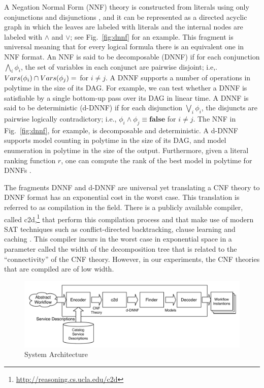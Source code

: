 \documentclass{llncs}
\begin{document}
A Negation Normal Form (NNF) theory is constructed from literals using only conjunctions
and disjunctions \cite{barwise:handbook}, and it can be represented as a directed
acyclic graph in which the leaves are labeled with literals and the internal nodes
are labeled with $\land$ and $\lor$; see Fig.~\ref{fig:dnnf} for an example.
This fragment is universal meaning that for every logical formula there is an
equivalent one in NNF format.
An NNF is said to be decomposable (DNNF) \cite{darwiche:d-dnnfs} if for each conjunction
$\bigwedge_i\phi_i$, the set of variables in each conjunct are pairwise disjoint; i.e,.
$Vars(\phi_i)\cap Vars(\phi_j)=\empty$ for $i\neq j$.
A DNNF supports a number of operations in polytime in the size of its DAG.
For example, we can test whether a DNNF is satisfiable by a single bottom-up pass
over its DAG in linear time.
A DNNF is said to be deterministic (d-DNNF) \cite{darwiche:d-dnnfs} if for each
disjunction $\bigvee_i\phi_i$, the disjuncts are pairwise logically contradictory;
i.e., $\phi_i\land\phi_j\equiv\textbf{false}$ for $i\neq j$.
The NNF in Fig.~\ref{fig:dnnf}, for example, is decomposable and deterministic.
A d-DNNF supports model counting in polytime in the size of its DAG, and model
enumeration in polytime in the size of the output.
Furthermore, given a literal ranking function $r$, one can compute the rank
of the best model in polytime for DNNFs \cite{darwiche:weighted}.

The fragments DNNF and d-DNNF are universal yet translating a CNF theory 
to DNNF format has an exponential cost in the worst case. This translation
is referred to as compilation in the field. There is a publicly available
compiler, called c2d,\footnote{\url{http://reasoning.cs.ucla.edu/c2d}}
that perform this compilation process and that make
use of modern SAT techniques such as conflict-directed backtracking,
clause learning and caching \cite{darwiche:compiler}.
This compiler incurs in the worst case in exponential space in a parameter
called the width of the decomposition tree that is related to the ``connectivity''
of the CNF theory. However, in our experiments, the CNF theories that are
compiled are of low width.


\begin{figure}[t]
\centering
\includegraphics[width=.9\textwidth]{architecture}
\caption{System Architecture}
\label{fig:architecture}
\end{figure}
\end{document}
